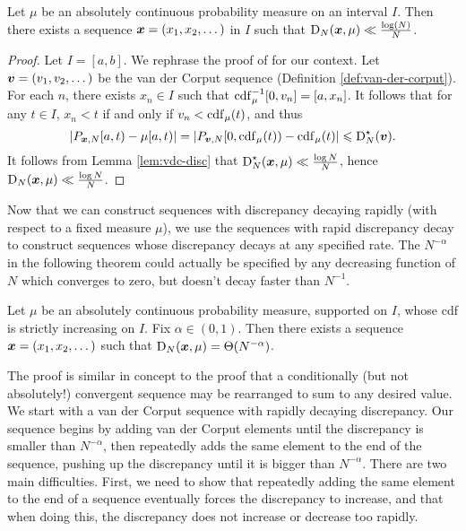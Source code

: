 \begin{theorem}\label{thm:van-der-corput}
Let $\mu$ be an absolutely continuous probability measure on an interval $I$. 
Then there exists a sequence ${\boldsymbol x}=(x_1,x_2,\dots)$ in $I$ such that 
$\operatorname{D}_N({\boldsymbol x},\mu) \ll \frac{\log(N)}{N}$. 
\end{theorem}
\begin{proof}
Let $I = [a,b]$. We rephrase the proof of 
\cite[Ch.~2 Lem.~4.2]{kuipers-niederreiter-1974} for our context. Let 
${\boldsymbol v} = (v_1,v_2,\dots)$ be the van der Corput sequence (Definition 
\ref{def:van-der-corput}). For each $n$, there exists $x_n\in I$ such that 
$\operatorname{cdf}_\mu^{-1}[0,v_n] = [a,x_n]$. It follows that for any $t\in I$, $x_n < t$ 
if and only if $v_n < \operatorname{cdf}_\mu(t)$, and thus 
\[
	\left|P_{{\boldsymbol x},N}[a,t) - \mu[a,t)\right| = \left|P_{{\boldsymbol v},N}[0,\operatorname{cdf}_\mu(t)) - \operatorname{cdf}_\mu(t)\right| \leqslant \operatorname{D}_N^\star({\boldsymbol v}) .
\]
It follows from Lemma \ref{lem:vdc-disc} that 
$\operatorname{D}_N^\star({\boldsymbol x},\mu) \ll \frac{\log N}{N}$, hence 
$\operatorname{D}_N({\boldsymbol x},\mu) \ll \frac{\log N}{N}$. 
\end{proof}

Now that we can construct sequences with discrepancy decaying rapidly (with 
respect to a fixed measure $\mu$), we use the sequences with rapid discrepancy 
decay to construct sequences whose discrepancy decays at any specified rate. 
The $N^{-\alpha}$ in the following theorem could actually be specified by any 
decreasing function of $N$ which converges to zero, but doesn't decay faster 
than $N^{-1}$. 

\begin{theorem}\label{thm:discrepancy-arbitrary}
Let $\mu$ be an absolutely continuous probability measure, supported on $I$, 
whose cdf is strictly increasing on $I$. Fix $\alpha\in (0,1)$. Then there 
exists a sequence ${\boldsymbol x}=(x_1,x_2,\dots)$ such that 
$\operatorname{D}_N({\boldsymbol x},\mu) = \Theta(N^{-\alpha})$. 
\end{theorem}

The proof is similar in concept to the proof that a conditionally (but not 
absolutely!) convergent sequence may be rearranged to sum to any desired value. 
We start with a van der Corput sequence with rapidly decaying discrepancy. Our 
sequence begins by adding van der Corput elements until the discrepancy is 
smaller than $N^{-\alpha}$, then repeatedly adds the same element to the end 
of the sequence, pushing up the discrepancy until it is bigger than 
$N^{-\alpha}$. There are two main difficulties. First, we need to show that 
repeatedly adding the same element to the end of a sequence eventually forces 
the discrepancy to increase, and that when doing this, the discrepancy does not 
increase or decrease too rapidly. 

